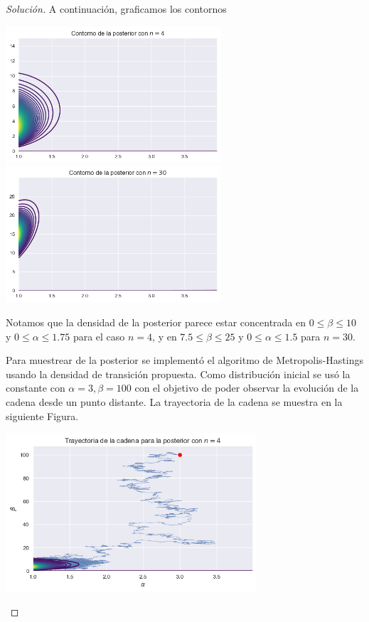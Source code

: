 \documentclass{article}
\begin{document}
\begin{enumerate}
\begin{proof}[Solución]
        A continuación, graficamos los contornos 

        \begin{center}
            \includegraphics[width=0.6\textwidth]{tarea7/cont4.png}
            \includegraphics[width=0.6\textwidth]{tarea7/cont30.png}
        \end{center}

        Notamos que la densidad de la posterior parece estar concentrada en $0 \le \beta \le 10$ y
        $0 \le \alpha \le 1.75$ para el caso $n=4$, y en $7.5 \le \beta \le 25$ y $0\le \alpha \le 1.5$
        para $n=30$.

        Para muestrear de la posterior se implementó el algoritmo de Metropolis-Hastings usando la
        densidad de transición propuesta. Como distribución inicial se usó la constante con 
        $\alpha = 3, \beta=100$ con el objetivo de poder observar la evolución de la cadena desde
        un punto distante. La trayectoria de la cadena se muestra en la siguiente Figura.

        \begin{center}
            \includegraphics[width=0.7\textwidth]{tarea7/gamma4_norm.png}
        \end{center}


\end{proof}
\end{enumerate}
\end{document}
